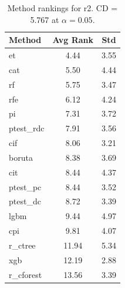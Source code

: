 \begin{table}[h]
\centering
\caption{Method rankings for r2. CD = 5.767 at $\alpha=0.05$.}
\label{tab:ranks_r2}
\begin{tabular}{lcc}
\toprule
Method & Avg Rank & Std \\
\midrule
et & 4.44 & 3.55 \\
cat & 5.50 & 4.44 \\
rf & 5.75 & 3.47 \\
rfe & 6.12 & 4.24 \\
pi & 7.31 & 3.72 \\
ptest_rdc & 7.91 & 3.56 \\
cif & 8.06 & 3.21 \\
boruta & 8.38 & 3.69 \\
cit & 8.44 & 4.37 \\
ptest_pc & 8.44 & 3.52 \\
ptest_dc & 8.72 & 3.39 \\
lgbm & 9.44 & 4.97 \\
cpi & 9.81 & 4.07 \\
r_ctree & 11.94 & 5.34 \\
xgb & 12.19 & 2.88 \\
r_cforest & 13.56 & 3.39 \\
\bottomrule
\end{tabular}
\end{table}